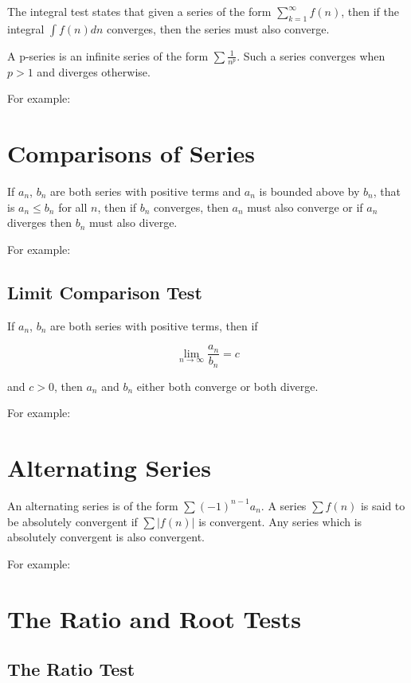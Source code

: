 \documentclass{article}
\begin{document}
The integral test states that given a series of the form
$\displaystyle\sum^\infty_{k=1}f(n)$, then if the integral $\displaystyle\int f(n)dn$ converges,
then the series must also converge.

A p-series is an infinite series of the form $\displaystyle\sum \frac{1}{n^p}$.
Such a series converges when $p > 1$ and diverges otherwise.

For example:

\section{Comparisons of Series}

If $a_n$, $b_n$ are both series with positive terms and $a_n$ is
bounded above by $b_n$, that is $a_n \leq b_n$ for all $n$, then if
$b_n$ converges, then $a_n$ must also converge or if $a_n$ diverges
then $b_n$ must also diverge.

For example:

\subsection{Limit Comparison Test}

If $a_n$, $b_n$ are both series with positive terms, then if

\[
\lim_{n \to \infty} \frac{a_n}{b_n} = c
\]

and $c > 0$, then $a_n$ and $b_n$ either both converge or both diverge.

For example:

\section{Alternating Series}

An alternating series is of the form $\sum (-1)^{n-1}a_n$.  A series
$\sum f(n)$ is said to be absolutely convergent if $\sum \left|
  f(n) \right|$ is convergent.  Any series which is absolutely
convergent is also convergent.

For example:

\section{The Ratio and Root Tests}

\subsection{The Ratio Test}
\end{document}
